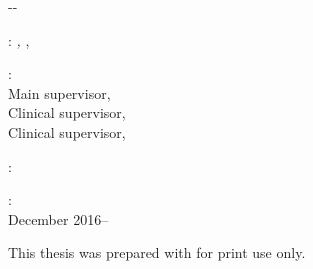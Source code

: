 \thispagestyle{empty}


\begin{adjustwidth*}{}{-\marginparsep-\marginparwidth}

\hfill

\vfill

\noindent\myName: \textit{\myTitle,} \mySubtitle, %
\myTime

\bigskip

\noindent{}: \\
Main supervisor, \myProf \\
Clinical supervisor, \myOtherProf \\
Clinical supervisor, \mySupervisor \\

\medskip

\noindent{}: \\
\myLocation

\medskip

\noindent{}: \\
December 2016--\myTime

\bigskip
\noindent This thesis was prepared with \texttt{\classicthesis} for print use only.

\end{adjustwidth*}
